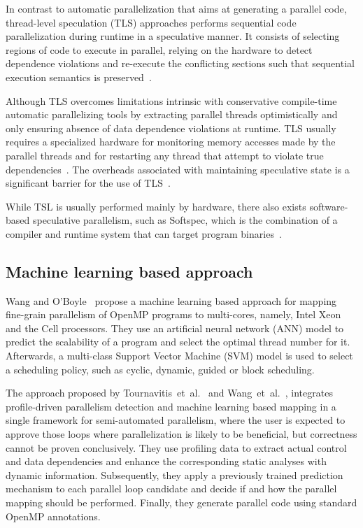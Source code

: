 \documentclass[a4paper,12pt]{article}
\newcommand{\etal}{et~al.}
\begin{document}
In contrast to automatic parallelization that aims at generating a parallel
code, thread-level speculation (TLS) approaches performs sequential code
parallelization during runtime in a speculative manner.  It consists of
selecting regions of code to execute in parallel, relying on the hardware to
detect dependence violations and re-execute the conflicting sections such that
sequential execution semantics is preserved~\cite{hammond98,chen03,wu08}.

Although TLS overcomes limitations intrinsic with conservative compile-time
automatic parallelizing tools by extracting parallel threads optimistically and
only ensuring absence of data dependence violations at runtime.  TLS usually
requires a specialized hardware for monitoring memory accesses made by the
parallel threads and for restarting any thread that attempt to violate true
dependencies~\cite{krishnan98,hammond98,wu08}.  The overheads associated with
maintaining speculative state is a significant barrier for the use of
TLS~\cite{yiapanis13}.

While TSL is usually performed mainly by hardware, there also exists
software-based speculative parallelism, such as Softspec, which is the
combination of a compiler and runtime system that can target program
binaries~\cite{bruening98}.

\subsection{Machine learning based approach}

Wang and O'Boyle~\cite{wang09} propose a machine learning based approach for
mapping fine-grain parallelism of OpenMP programs to multi-cores, namely, Intel
Xeon and the Cell processors.  They use an artificial neural network (ANN)
model to predict the scalability of a program and select the optimal thread
number for it.  Afterwards, a multi-class Support Vector Machine (SVM) model is
used to select a scheduling policy, such as cyclic, dynamic, guided or block
scheduling. 

The approach proposed by Tournavitis~\etal~\cite{tournavitis09} and
Wang~\etal~\cite{wang14a}, integrates profile-driven parallelism detection and
machine learning based mapping in a single framework for semi-automated
parallelism, where the user is expected to approve those loops where
parallelization is likely to be beneficial, but correctness cannot be proven
conclusively.  They use profiling data to extract actual control and data
dependencies and enhance the corresponding static analyses with dynamic
information. Subsequently, they apply a previously trained prediction mechanism
to each parallel loop candidate and decide if and how the parallel mapping
should be performed. Finally, they generate parallel code using standard OpenMP
annotations.
\end{document}
